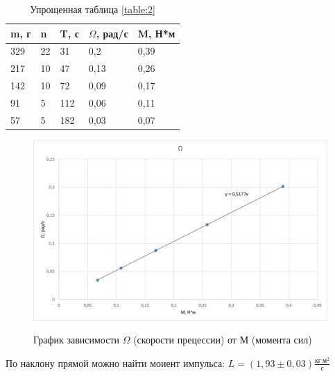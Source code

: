 \documentclass[a4paper,12pt]{article} %
\begin{document}
\begin{enumerate}
\begin{table} [h] \center
\begin{tabular}{l|l|l|l|l}
m, г&n&T, с&$\Omega$, рад/с&M, Н*м\\
\hline
 329 &22& 31 & 0,2 & 0,39 \\
 217 &10& 47 & 0,13 & 0,26 \\
 142 &10& 72 & 0,09 & 0,17 \\
 91 &5& 112 & 0,06 & 0,11 \\
 57 &5& 182 & 0,03 & 0,07 \\
\end{tabular}
\caption{Упрощенная таблица \ref{table:2} \label{table:3}}
\end{table}

\begin{figure} [h] \center
	\includegraphics[scale=0.8]{./125/graph1.png}
	\label{graph:1} \label{pic:4}
	\caption[Рис. 4]{График зависимости $\Omega$ (скорости прецессии) от М (момента сил)}
\end{figure}

По наклону прямой можно найти моиент импульса: 
$L = (1,93 \pm 0,03) \frac{\text{кг}\ \text{м}^2}{\text{с}}$

\newpage


\end{enumerate}
\end{document}
